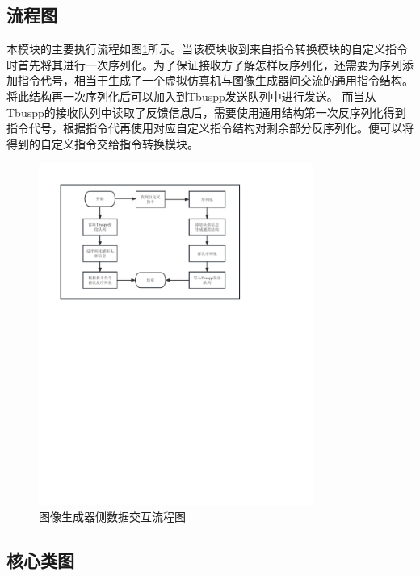 \subsection{流程图}
 本模块的主要执行流程如图\ref{module31}所示。当该模块收到来自指令转换模块的自定义指令时首先将其进行一次序列化。为了保证接收方了解怎样反序列化，还需要为序列添加指令代号，相当于生成了一个虚拟仿真机与图像生成器间交流的通用指令结构。将此结构再一次序列化后可以加入到Tbuspp发送队列中进行发送。
 而当从Tbuspp的接收队列中读取了反馈信息后，需要使用通用结构第一次反序列化得到指令代号，根据指令代再使用对应自定义指令结构对剩余部分反序列化。便可以将得到的自定义指令交给指令转换模块。
\begin{figure}[h!]
    \begin{center}
        \includegraphics[width=0.8\textwidth]{pictures/flowchart3.pdf}
        \caption{图像生成器侧数据交互流程图}
        \label{module31}
    \end{center}
\end{figure}
\subsection{核心类图}

